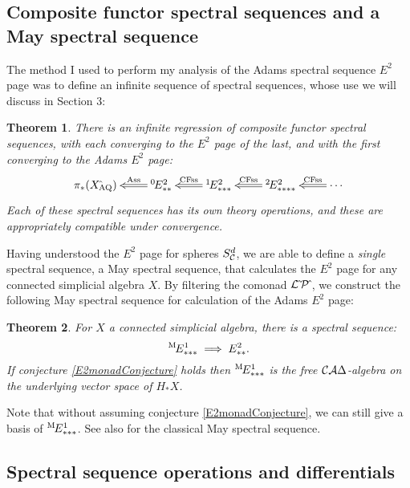 \documentclass[11pt]{article}
\theoremstyle{plain}
\newtheorem{theorem}{Theorem}
\begin{document}
\subsection{Composite functor spectral sequences and a May spectral sequence}
The method I used to perform my analysis of the Adams spectral sequence $E^2$ page was to define an infinite sequence of spectral sequences, whose use we will discuss in Section 3:
\begin{theorem}\label{CompFuncMasterDiag}
There is an infinite regression of composite functor spectral sequences, with each converging to the $E^2$ page of the last, and with the first converging to the Adams $E^2$ page:
\[\xymatrix@R=4mm{
\pi_{*}(X{\hat{\,}_\textup{\!\!AQ}})&%
\ar@{=>}[l]_-{\textup{Ass}}
{^{0\!}}E^2_{**}&%
\ar@{=>}[l]_-{\textup{CFss}}
{^{1\!}}E^2_{***}
&%
{^{2\!}}E^2_{****}
\ar@{=>}[l]_-{\textup{CFss}}&%
\cdots
\ar@{=>}[l]_-{\textup{CFss}}%
}\]
Each of these spectral sequences has its own theory operations, and these are appropriately compatible under convergence.
\end{theorem}

Having understood the $E^2$ page for spheres $S^d_{\mathcal{C}}$, we are able to define a \emph{single} spectral sequence, a May spectral sequence, that calculates the $E^2$ page for any connected simplicial algebra $X$.
By filtering the comonad $\mathcal{L}{\hat\,}\mathcal{P}{\hat\,}$, we construct the following May spectral sequence for calculation of the Adams $E^2$ page:
\begin{theorem}
For $X$ a connected simplicial algebra, there is a spectral sequence:
\[{^{\textup{M}\!}}E^1_{***}\implies E^2_{**}.\]
If conjecture \ref{E2monadConjecture} holds then ${^{\textup{M}\!}}E^1_{***}$ is the free $\mathcal{C}\mathcal{A}\Delta$-algebra on the underlying vector space of $H_*X$. 
\end{theorem}
\noindent Note that without assuming conjecture \ref{E2monadConjecture}, we can still give a basis of ${^{\textup{M}\!}}E^1_{***}$. See also \cite{MayRestLie.pdf} for the classical May spectral sequence.


\subsection{Spectral sequence operations and differentials}
\end{document}
